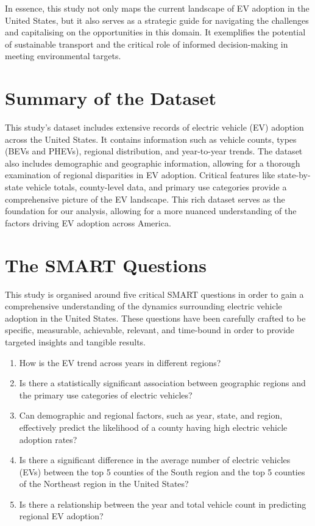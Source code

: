 \documentclass[
  letterpaper,
  DIV=11,
  numbers=noendperiod]{scrartcl}
\begin{document}
In essence, this study not only maps the current landscape of EV
adoption in the United States, but it also serves as a strategic guide
for navigating the challenges and capitalising on the opportunities in
this domain. It exemplifies the potential of sustainable transport and
the critical role of informed decision-making in meeting environmental
targets.

\hypertarget{summary-of-the-dataset}{%
\section{Summary of the Dataset}\label{summary-of-the-dataset}}

This study's dataset includes extensive records of electric vehicle (EV)
adoption across the United States. It contains information such as
vehicle counts, types (BEVs and PHEVs), regional distribution, and
year-to-year trends. The dataset also includes demographic and
geographic information, allowing for a thorough examination of regional
disparities in EV adoption. Critical features like state-by-state
vehicle totals, county-level data, and primary use categories provide a
comprehensive picture of the EV landscape. This rich dataset serves as
the foundation for our analysis, allowing for a more nuanced
understanding of the factors driving EV adoption across America.

\hypertarget{the-smart-questions}{%
\section{The SMART Questions}\label{the-smart-questions}}

This study is organised around five critical SMART questions in order to
gain a comprehensive understanding of the dynamics surrounding electric
vehicle adoption in the United States. These questions have been
carefully crafted to be specific, measurable, achievable, relevant, and
time-bound in order to provide targeted insights and tangible results.

\begin{enumerate}
\def\labelenumi{\arabic{enumi})}
\item
  How is the EV trend across years in different regions?
\item
  Is there a statistically significant association between geographic
  regions and the primary use categories of electric vehicles?
\item
  Can demographic and regional factors, such as year, state, and region,
  effectively predict the likelihood of a county having high electric
  vehicle adoption rates?
\item
  Is there a significant difference in the average number of electric
  vehicles (EVs) between the top 5 counties of the South region and the
  top 5 counties of the Northeast region in the United States?
\item
  Is there a relationship between the year and total vehicle count in
  predicting regional EV adoption?
\end{enumerate}
\end{document}
